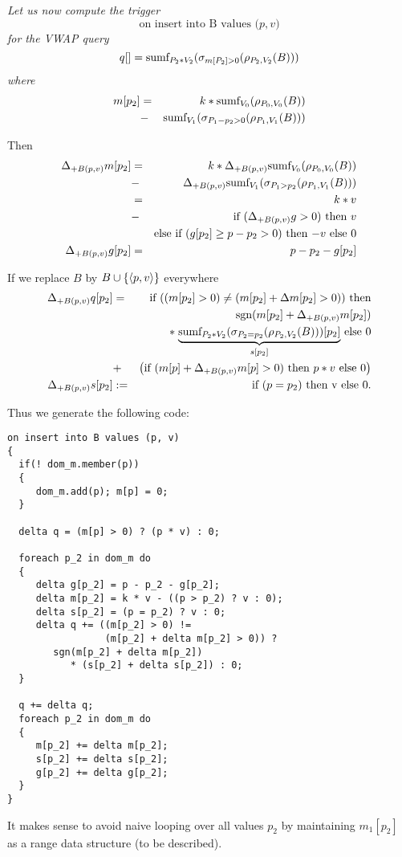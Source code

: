 \begin{example}\em
Let us now compute the trigger
\[
\mbox{on insert into B values ($p, v$)}
\]
for the VWAP query
\[
q[] = \mbox{sumf}_{P_2 * V_2}(\sigma_{m[P_2] > 0}(\rho_{P_2, V_2}(B)))
\]
where
\begin{eqnarray*}
m[p_2] &=&  k * \mbox{sumf}_{V_0}(\rho_{P_0, V_0}(B))   \\
       &-&  \mbox{sumf}_{V_1}(\sigma_{P_1 - p_2 > 0}(\rho_{P_1, V_1}(B)))
\end{eqnarray*}

Then
\begin{eqnarray*}
\Delta_{+B(p,v)} m[p_2] &=&
            k * \Delta_{+B(p,v)} \mbox{sumf}_{V_0}(\rho_{P_0, V_0}(B))   \\
       &-&  \Delta_{+B(p,v)} \mbox{sumf}_{V_1}(\sigma_{P_1 > p_2}(\rho_{P_1, V_1}(B)))
\\
&=& k * v \\
&-& \mbox{if $(\Delta_{+B(p,v)} g > 0)$ then $v$} \\
& & \mbox{else if $(g[p_2] \ge p-p_2 > 0)$ then $-v$ else 0}
\\
\Delta_{+B(p,v)} g[p_2] &=& p - p_2 - g[p_2]
\end{eqnarray*}



If we replace $B$ by $B \cup \{{\langle p, v\rangle}\}$ everywhere
\begin{eqnarray*}
\Delta_{+B(p,v)} q[p_2] &=&
\mbox{if ($(m[p_2] > 0) \neq (m[p_2] + \Delta m[p_2] > 0))$ then}
\\
&& ~~~
      \mbox{sgn}(m[p_2] + \Delta_{+B(p,v)} m[p_2]) \\
&& ~~~~~~ * \;  \mbox{$\underbrace{\mbox{sumf}_{P_2 * V_2}(\sigma_{P_2=p_2}(\rho_{P_2,V_2}(B)))[p_2]}_{s[p_2]}$ else 0}
\\
&+&
\big( \mbox{if $(m[p] + \Delta_{+B(p,v)} m[p] > 0)$ then $p * v$ else $0$} \big)
\\
\Delta_{+B(p,v)} s[p_2] &:=& \mbox{if $(p = p_2)$ then v else 0}.
\end{eqnarray*}

Thus we generate the following code:
\begin{verbatim}
on insert into B values (p, v)
{
  if(! dom_m.member(p))
  {
     dom_m.add(p); m[p] = 0;
  }

  delta q = (m[p] > 0) ? (p * v) : 0;

  foreach p_2 in dom_m do
  {
     delta g[p_2] = p - p_2 - g[p_2];
     delta m[p_2] = k * v - ((p > p_2) ? v : 0);
     delta s[p_2] = (p = p_2) ? v : 0;
     delta q += ((m[p_2] > 0) !=
                 (m[p_2] + delta m[p_2] > 0)) ?
        sgn(m[p_2] + delta m[p_2])
           * (s[p_2] + delta s[p_2]) : 0;
  }

  q += delta q;
  foreach p_2 in dom_m do
  {
     m[p_2] += delta m[p_2];
     s[p_2] += delta s[p_2];
     g[p_2] += delta g[p_2];
  }
}
\end{verbatim}


It makes sense to avoid naive looping over all values $p_2$ by maintaining
$m_1[p_2]$ as a range data structure (to be described).
\punto
\end{example}







